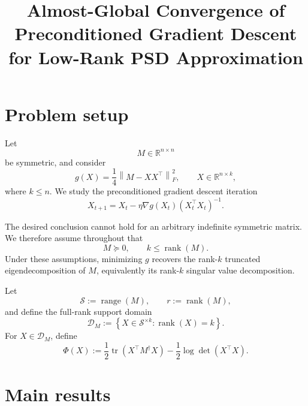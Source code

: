 \documentclass[11pt]{article}
\title{Almost-Global Convergence of Preconditioned Gradient Descent for Low-Rank PSD Approximation}
\author{}
\date{}
\newcommand{\RR}{\mathbb{R}}
\newcommand{\rank}{\operatorname{rank}}
\newcommand{\range}{\operatorname{range}}
\newcommand{\tr}{\operatorname{tr}}
\newcommand{\cD}{\mathcal{D}}
\newcommand{\cS}{\mathcal{S}}
\begin{document}
\maketitle

\section{Problem setup}

Let
\[
M\in\RR^{n\times n}
\]
be symmetric, and consider
\[
g(X)
=
\frac14\left\|M-XX^\top\right\|_F^2,
\qquad
X\in\RR^{n\times k},
\]
where \(k\le n\). We study the preconditioned gradient descent iteration
\[
X_{t+1}
=
X_t
-
\eta \nabla g(X_t)(X_t^\top X_t)^{-1}.
\]

The desired conclusion cannot hold for an arbitrary indefinite symmetric matrix.
We therefore assume throughout that
\[
M\succeq 0,
\qquad
k\le \rank(M).
\]
Under these assumptions, minimizing \(g\) recovers the rank-\(k\) truncated
eigendecomposition of \(M\), equivalently its rank-\(k\) singular value
decomposition.

Let
\[
\cS:=\range(M),
\qquad
r:=\rank(M),
\]
and define the full-rank support domain
\[
\cD_M
:=
\left\{
X\in \cS^{\times k}:\rank(X)=k
\right\}.
\]
For \(X\in\cD_M\), define
\[
\Phi(X)
:=
\frac12\tr(X^\top M^\dagger X)
-
\frac12\log\det(X^\top X).
\]

\section{Main results}
\end{document}
